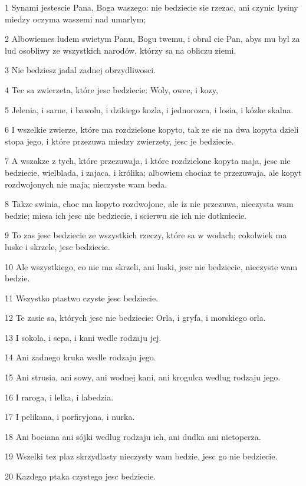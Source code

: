 \par 1 Synami jestescie Pana, Boga waszego: nie bedziecie sie rzezac, ani czynic lysiny miedzy oczyma waszemi nad umarlym;
\par 2 Albowiemes ludem swietym Panu, Bogu twemu, i obral cie Pan, abys mu byl za lud osobliwy ze wszystkich narodów, którzy sa na obliczu ziemi.
\par 3 Nie bedziesz jadal zadnej obrzydliwosci.
\par 4 Tec sa zwierzeta, które jesc bedziecie: Woly, owce, i kozy,
\par 5 Jelenia, i sarne, i bawolu, i dzikiego kozla, i jednorozca, i losia, i kózke skalna.
\par 6 I wszelkie zwierze, które ma rozdzielone kopyto, tak ze sie na dwa kopyta dzieli stopa jego, i które przezuwa miedzy zwierzety, jesc je bedziecie.
\par 7 A wszakze z tych, które przezuwaja, i które rozdzielone kopyta maja, jesc nie bedziecie, wielblada, i zajaca, i królika; albowiem chociaz te przezuwaja, ale kopyt rozdwojonych nie maja; nieczyste wam beda.
\par 8 Takze swinia, choc ma kopyto rozdwojone, ale iz nie przezuwa, nieczysta wam bedzie; miesa ich jesc nie bedziecie, i scierwu sie ich nie dotkniecie.
\par 9 To zas jesc bedziecie ze wszystkich rzeczy, które sa w wodach; cokolwiek ma luske i skrzele, jesc bedziecie.
\par 10 Ale wszystkiego, co nie ma skrzeli, ani luski, jesc nie bedziecie, nieczyste wam bedzie.
\par 11 Wszystko ptastwo czyste jesc bedziecie.
\par 12 Te zasie sa, których jesc nie bedziecie: Orla, i gryfa, i morskiego orla.
\par 13 I sokola, i sepa, i kani wedle rodzaju jej.
\par 14 Ani zadnego kruka wedle rodzaju jego.
\par 15 Ani strusia, ani sowy, ani wodnej kani, ani krogulca wedlug rodzaju jego.
\par 16 I raroga, i lelka, i labedzia.
\par 17 I pelikana, i porfiryjona, i nurka.
\par 18 Ani bociana ani sójki wedlug rodzaju ich, ani dudka ani nietoperza.
\par 19 Wszelki tez plaz skrzydlasty nieczysty wam bedzie, jesc go nie bedziecie.
\par 20 Kazdego ptaka czystego jesc bedziecie.
